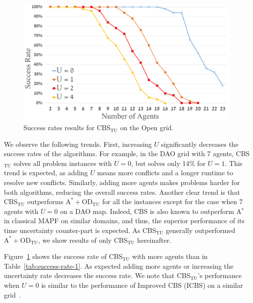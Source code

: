 \documentclass[jair,twoside,11pt,theapa]{article}
\newcommand{\astar}{A$^*$\xspace}
\newcommand{\odatu}{$\mathrm{A^{*}+OD_{TU}}$\xspace}
\newcommand{\cbstu}{CBS$\mathrm{_{TU}}$\xspace}
\begin{document}
\begin{figure}[t]
  \centering
  \includegraphics[width=0.8\columnwidth]{Figures/Success-vs_U.pdf}
  \caption{Success rates results for \cbstu on the Open grid.}
  \label{fig:cbs-success}
\end{figure}

We observe the following trends.
First, increasing $U$ significantly decreases the success rates of the algorithms.
For example, in the DAO grid with 7 agents, 
\cbstu solves all problem instances with $U=0$, but solves only 14\% for $U=1$. 
This trend is expected, as adding $U$ means more conflicts and a longer runtime to resolve new conflicts. 
Similarly, adding more agents makes problems harder for both algorithms, reducing the overall success rates. 
Another clear trend is that \cbstu outperforms \odatu for all the instances except for the case when 7 agents with $U=0$ on a DAO map. 
Indeed, CBS is also known to outperform \astar in classical MAPF on similar domains, 
and thus, the superior performance of its time uncertainty counter-part is expected. 
As \cbstu generally outperformed \odatu, we show results of only \cbstu hereinafter. 


Figure~\ref{fig:cbs-success} shows the success rate of \cbstu with more agents than in Table~\ref{tab:success-rate-1}. 
As expected adding more agents or increasing the uncertainty rate decreases the success rate. 
We note that \cbstu's performance when $U=0$ is similar to the performance of Improved CBS (ICBS) on a similar grid~.
\end{document}
